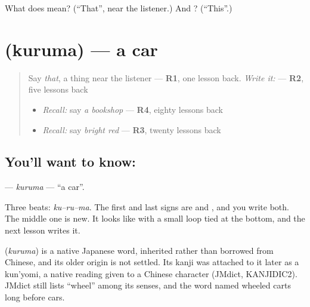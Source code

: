 \begin{tcolorbox}[breakable,colback=teal!4,colframe=teal!35!black,title={Before you move on}]
What does  mean? (\textquotedblleft{}That\textquotedblright{}, near the listener.) And ? (\textquotedblleft{}This\textquotedblright{}.)
\end{tcolorbox}
\section[\texorpdfstring{\ja{くるま} (kuruma)}{くるま (kuruma)}]{ (kuruma) — a car}

\label{lesson:JA-C132-kuruma}



\begin{quote}
Say \emph{that}, a thing near the listener — \textbf{R1}, one lesson back. \emph{Write it:} \textbf{} — \textbf{R2}, five lessons back

\begin{itemize}
\raggedright
  \item \emph{Recall:} say \emph{a bookshop} — \textbf{R4}, eighty lessons back
  \item \emph{Recall:} say \emph{bright red} — \textbf{R3}, twenty lessons back
\end{itemize}
\end{quote}

\subsection*{You'll want to know: }
\textbf{} — \emph{kuruma} — \textquotedblleft{}a car\textquotedblright{}.

Three beats: \emph{ku–ru–ma}. The first and last signs are \textbf{} and \textbf{}, and you write both. The middle one is new. It looks like \textbf{} with a small loop tied at the bottom, and the next lesson writes it.

\begin{cousinweb}
\textbf{} (\emph{kuruma}) is a native Japanese word, inherited rather than borrowed from Chinese, and its older origin is not settled. Its kanji was attached to it later as a kun'yomi, a native reading given to a Chinese character (JMdict, KANJIDIC2). JMdict still lists \textquotedblleft{}wheel\textquotedblright{} among its senses, and the word named wheeled carts long before cars.
\end{cousinweb}

